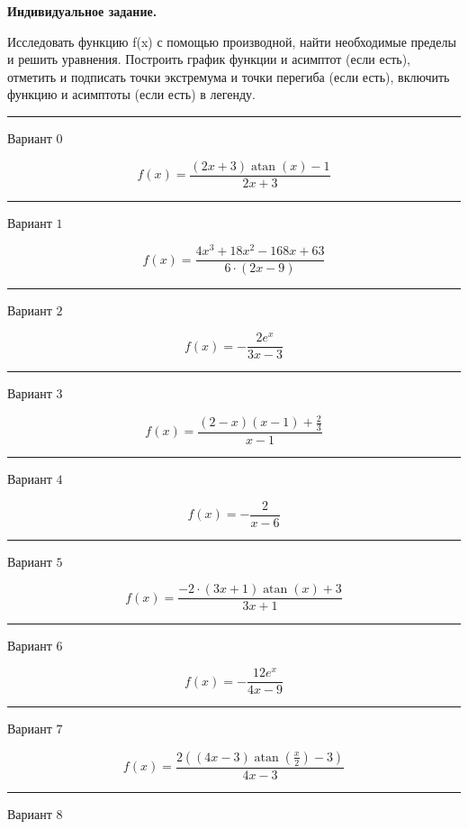 \documentclass[11pt]{report}
\begin{document}
\pagestyle{empty}
{\bf Индивидуальное задание.}

Исследовать функцию f(x) с помощью производной, найти необходимые пределы и решить уравнения. Построить график функции и асимптот (если есть), отметить и подписать точки экстремума и точки перегиба (если есть), включить функцию и асимптоты (если есть) в легенду.

\begin{center}
\noindent\rule{8cm}{0.4pt}
\end{center}
Вариант $0$


$$f(x) = \frac{\left(2 x + 3\right) \operatorname{atan}{\left(x \right)} - 1}{2 x + 3}$$
\begin{center}
\noindent\rule{8cm}{0.4pt}
\end{center}
Вариант $1$


$$f(x) = \frac{4 x^{3} + 18 x^{2} - 168 x + 63}{6 \cdot \left(2 x - 9\right)}$$
\begin{center}
\noindent\rule{8cm}{0.4pt}
\end{center}
Вариант $2$


$$f(x) = - \frac{2 e^{x}}{3 x - 3}$$
\begin{center}
\noindent\rule{8cm}{0.4pt}
\end{center}
Вариант $3$


$$f(x) = \frac{\left(2 - x\right) \left(x - 1\right) + \frac{2}{3}}{x - 1}$$
\begin{center}
\noindent\rule{8cm}{0.4pt}
\end{center}
Вариант $4$


$$f(x) = - \frac{2}{x - 6}$$
\begin{center}
\noindent\rule{8cm}{0.4pt}
\end{center}
Вариант $5$


$$f(x) = \frac{- 2 \cdot \left(3 x + 1\right) \operatorname{atan}{\left(x \right)} + 3}{3 x + 1}$$
\begin{center}
\noindent\rule{8cm}{0.4pt}
\end{center}
Вариант $6$


$$f(x) = - \frac{12 e^{x}}{4 x - 9}$$
\begin{center}
\noindent\rule{8cm}{0.4pt}
\end{center}
Вариант $7$


$$f(x) = \frac{2 \left(\left(4 x - 3\right) \operatorname{atan}{\left(\frac{x}{2} \right)} - 3\right)}{4 x - 3}$$
\begin{center}
\noindent\rule{8cm}{0.4pt}
\end{center}
Вариант $8$
\end{document}
